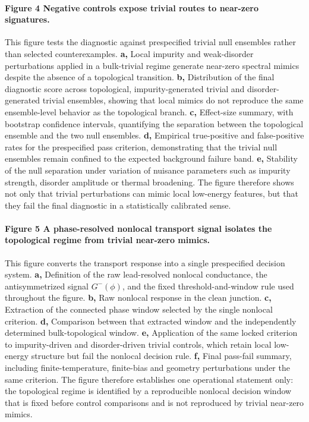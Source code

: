 \documentclass[11pt]{article}
\begin{document}
\paragraph{Figure 4 \textbar{} Negative controls expose trivial routes to near-zero signatures.}
This figure tests the diagnostic against prespecified trivial null ensembles rather than selected counterexamples. \textbf{a,} Local impurity and weak-disorder perturbations applied in a bulk-trivial regime generate near-zero spectral mimics despite the absence of a topological transition. \textbf{b,} Distribution of the final diagnostic score across topological, impurity-generated trivial and disorder-generated trivial ensembles, showing that local mimics do not reproduce the same ensemble-level behavior as the topological branch. \textbf{c,} Effect-size summary, with bootstrap confidence intervals, quantifying the separation between the topological ensemble and the two null ensembles. \textbf{d,} Empirical true-positive and false-positive rates for the prespecified pass criterion, demonstrating that the trivial null ensembles remain confined to the expected background failure band. \textbf{e,} Stability of the null separation under variation of nuisance parameters such as impurity strength, disorder amplitude or thermal broadening. The figure therefore shows not only that trivial perturbations can mimic local low-energy features, but that they fail the final diagnostic in a statistically calibrated sense.

\paragraph{Figure 5 \textbar{} A phase-resolved nonlocal transport signal isolates the topological regime from trivial near-zero mimics.}
This figure converts the transport response into a single prespecified decision system. \textbf{a,} Definition of the raw lead-resolved nonlocal conductance, the antisymmetrized signal $G^{-}(\phi)$, and the fixed threshold-and-window rule used throughout the figure. \textbf{b,} Raw nonlocal response in the clean junction. \textbf{c,} Extraction of the connected phase window selected by the single nonlocal criterion. \textbf{d,} Comparison between that extracted window and the independently determined bulk-topological window. \textbf{e,} Application of the same locked criterion to impurity-driven and disorder-driven trivial controls, which retain local low-energy structure but fail the nonlocal decision rule. \textbf{f,} Final pass-fail summary, including finite-temperature, finite-bias and geometry perturbations under the same criterion. The figure therefore establishes one operational statement only: the topological regime is identified by a reproducible nonlocal decision window that is fixed before control comparisons and is not reproduced by trivial near-zero mimics.
\end{document}
